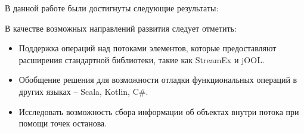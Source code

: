 В данной работе были достигнуты следующие результаты:


В качестве возможных направлений развития следует отметить:

\begin{itemize}
	\item Поддержка операций над потоками элементов, которые предоставляют расширения стандартной библиотеки, такие как StreamEx и jOOL.
	\item Обобщение решения для возможности отладки функциональных операций в других языках -- Scala, Kotlin, C\#.
	\item Исследовать возможность сбора информации об объектах внутри потока при помощи точек останова.
\end{itemize}